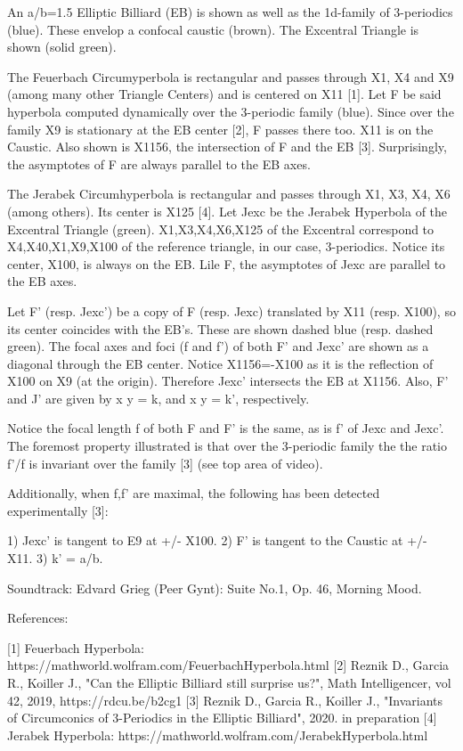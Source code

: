 An a/b=1.5 Elliptic Billiard (EB) is shown as well as the 1d-family of 3-periodics (blue). These envelop a confocal caustic (brown). The Excentral Triangle is shown (solid green).

The Feuerbach Circumyperbola is rectangular and passes through X1, X4 and X9 (among many other Triangle Centers) and is centered on X11 [1]. Let F be said hyperbola computed dynamically over the 3-periodic family (blue).  Since over the family X9 is stationary at the EB center [2],  F passes there too. X11 is on the Caustic. Also shown is X1156, the intersection of F and the EB [3]. Surprisingly, the asymptotes of F are always parallel to the EB axes.

The Jerabek Circumhyperbola is rectangular and passes through X1, X3, X4, X6 (among others). Its center is X125 [4]. Let Jexc be the Jerabek Hyperbola of the Excentral Triangle (green). X1,X3,X4,X6,X125 of the Excentral correspond to X4,X40,X1,X9,X100 of the reference triangle, in our case, 3-periodics. Notice its center, X100, is always on the EB. Lile F, the asymptotes of Jexc are parallel to the EB axes.

Let F' (resp. Jexc') be a copy of F (resp. Jexc) translated by X11 (resp. X100), so its center coincides with the EB's. These are shown dashed blue (resp. dashed green). The focal axes and foci (f and f') of both F' and Jexc' are shown as a diagonal through the EB center. Notice X1156=-X100 as it is the reflection of X100 on X9 (at the origin). Therefore Jexc' intersects the EB at X1156. Also, F' and J' are given by x y = k, and x y = k', respectively.

Notice the focal length f of both F and F' is the same, as is f' of Jexc and Jexc'. The foremost property illustrated is that over the 3-periodic family the the ratio f'/f is invariant over the family [3] (see top area of video).

Additionally, when f,f' are maximal, the following has been detected experimentally [3]:

1) Jexc' is tangent to E9 at +/- X100.
2) F' is tangent to the Caustic at +/- X11.
3) k' = a/b.

Soundtrack: Edvard Grieg (Peer Gynt): Suite No.1, Op. 46, Morning Mood.

References:

[1] Feuerbach Hyperbola: https://mathworld.wolfram.com/FeuerbachHyperbola.html
[2] Reznik D., Garcia R., Koiller J., "Can the Elliptic Billiard still surprise us?", Math Intelligencer, vol 42, 2019, https://rdcu.be/b2cg1
[3] Reznik D., Garcia R., Koiller J., "Invariants of Circumconics of 3-Periodics in the Elliptic Billiard", 2020. in preparation
[4] Jerabek Hyperbola: https://mathworld.wolfram.com/JerabekHyperbola.html
